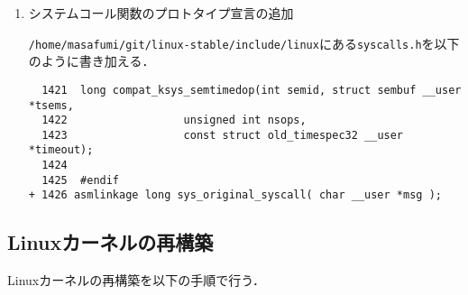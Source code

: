 \documentclass[12pt]{jsarticle}
\begin{document}
\begin{enumerate}
\item システムコール関数のプロトタイプ宣言の追加
  
  \verb|/home/masafumi/git/linux-stable/include/linux|にある\verb|syscalls.h|を以下のように書き加える．
\begin{verbatim}
  1421	long compat_ksys_semtimedop(int semid, struct sembuf __user *tsems,
  1422				    unsigned int nsops,
  1423				    const struct old_timespec32 __user *timeout);
  1424	
  1425	#endif
+ 1426 asmlinkage long sys_original_syscall( char __user *msg );
\end{verbatim}

\end{enumerate}

\subsection{Linuxカーネルの再構築}
Linuxカーネルの再構築を以下の手順で行う．
\end{document}
